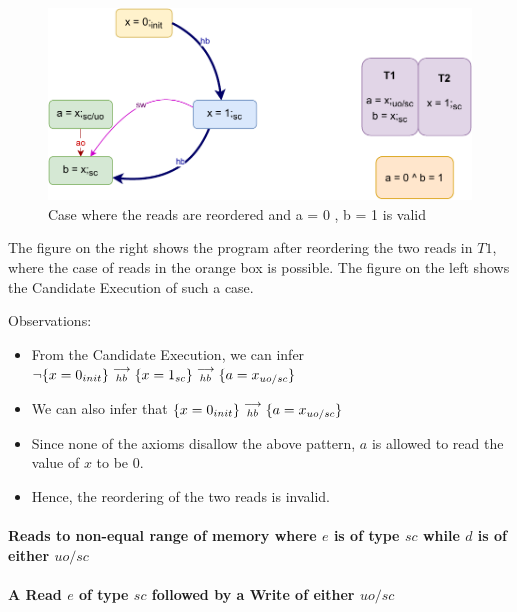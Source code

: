         \begin{figure}[H]
            \centering
            \includegraphics[scale=0.7]{InstructionReordering/Example1R(Rsc-Ruo,sc).pdf}
            \caption{Case where the reads are reordered and a = 0 , b = 1 is valid}
        \end{figure}

        The figure on the right shows the program after reordering the two reads in $T1$, where the case of reads in the orange box is possible. 
        The figure on the left shows the Candidate Execution of such a case. 

        Observations:
        \begin{itemize}
            \item From the Candidate Execution, we can infer $\neg\{x=0_{init}\}\stackrel{\longrightarrow}{_{hb}}\{x=1_{sc}\}\stackrel{\longrightarrow}{_{hb}}\{a=x_{uo/sc}\}$
            \item We can also infer that $\{x=0_{init}\}\stackrel{\longrightarrow}{_{hb}}\{a=x_{uo/sc}\}$    
            \item Since none of the axioms disallow the above pattern, $a$ is allowed to read the value of $x$ to be $0$.
            \item Hence, the reordering of the two reads is invalid. 
        \end{itemize}
    \paragraph{Reads to non-equal range  of memory where $e$ is of type $sc$ while $d$ is of either $uo/sc$}

    \paragraph{A Read $e$ of type $sc$ followed by a Write of either $uo/sc$}
        
